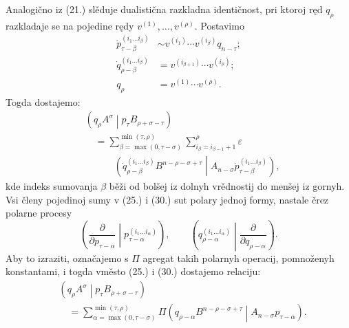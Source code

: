 \documentclass[11pt]{article}
\newcommand{\pair}[2]{\left(#1\middle|#2\right)}
\newcommand{\eps}{\varepsilon}
\begin{document}
Analogično iz (21.) slěduje dualistična razkladna identičnost, pri ktoroj ręd $q_\rho$ razkladaje se na pojedine rędy $v^{(1)},\ldots,v^{(\rho)}$. Postavimo
\begin{equation}
\begin{aligned}
 \dot p_{\tau-\beta}^{(i_1\ldots i_\beta)}
&\sim v^{(i_1)}\cdots v^{(i_\beta)}q_{n-\tau};\\
 \dot q_{\rho-\beta}^{(i_1\ldots i_\beta)}
&=v^{(i_{\beta+1})}\cdots v^{(i_\rho)};\\
 q_\rho&=v^{(1)}\cdots v^{(\rho)}.
\end{aligned}
\tag{29}
\end{equation}
Togda dostajemo:
\begin{equation}
\begin{aligned}
&\pair{q_\rho A^\sigma}{p_\tau B_{\rho+\sigma-\tau}}\\
&\quad=\sum_{\beta=\max(0,\tau-\sigma)}^{\min(\tau,\rho)}
\sum_{i_\beta=i_{\beta-1}+1}^{\rho}\eps\\
&\qquad\quad\pair{\dot q_{\rho-\beta}^{(i_1\ldots i_\beta)}
B^{n-\rho-\sigma+\tau}}
{A_{n-\sigma}\dot p_{\tau-\beta}^{(i_1\ldots i_\beta)}} ,
\end{aligned}
\tag{30}
\end{equation}
kde indeks sumovanja $\beta$ běži od bolšej iz dolnyh vrědnostij do menšej iz gornyh. Vsi členy pojedinoj sumy v (25.) i (30.) sut polary jednoj formy, nastale črez polarne procesy
\[
\left(\frac{\partial}{\partial p_{\tau-\alpha}}\middle|
p_{\tau-\alpha}^{(i_1\ldots i_\alpha)}\right),\qquad
\left(q_{\rho-\alpha}^{(i_1\ldots i_\alpha)}\middle|
\frac{\partial}{\partial q_{\rho-\alpha}}\right).
\]
Aby to izraziti, označajemo s $\Pi$ agregat takih polarnyh operacij, pomnoženyh konstantami, i togda vměsto (25.) i (30.) dostajemo relaciju:
\begin{equation}
\begin{aligned}
&\pair{q_\rho A^\sigma}{p_\tau B_{\rho+\sigma-\tau}}\\
&\quad=\sum_{\alpha=\max(0,\tau-\sigma)}^{\min(\tau,\rho)}
\Pi\pair{q_{\rho-\alpha}B^{n-\rho-\sigma+\tau}}
{A_{n-\sigma}p_{\tau-\alpha}}.
\end{aligned}
\tag{31}
\end{equation}
\end{document}
